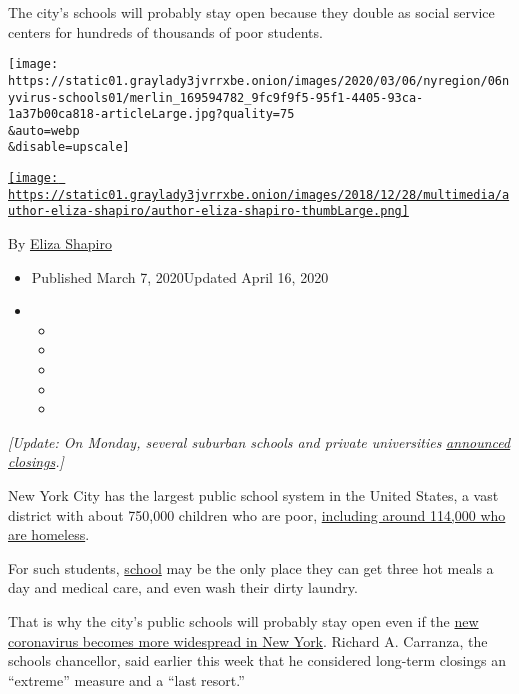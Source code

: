The city's schools will probably stay open because they double as social
service centers for hundreds of thousands of poor students.

\texttt{[image: https://static01.graylady3jvrrxbe.onion/images/2020/03/06/nyregion/06nyvirus-schools01/merlin\_169594782\_9fc9f9f5-95f1-4405-93ca-1a37b00ca818-articleLarge.jpg?quality=75\\\&auto=webp\\\&disable=upscale]}

\href{https://www.nytimes3xbfgragh.onion/by/eliza-shapiro}{\texttt{[image: https://static01.graylady3jvrrxbe.onion/images/2018/12/28/multimedia/author-eliza-shapiro/author-eliza-shapiro-thumbLarge.png]}}

By \href{https://www.nytimes3xbfgragh.onion/by/eliza-shapiro}{Eliza
Shapiro}

\begin{itemize}
\item
  Published March 7, 2020Updated April 16, 2020
\item
  \begin{itemize}
  \item
  \item
  \item
  \item
  \item
  \end{itemize}
\end{itemize}

\emph{{[}Update: On Monday, several suburban schools and private
universities}
\href{https://www.nytimes3xbfgragh.onion/2020/03/09/nyregion/coronavirus-new-york.html}{\emph{announced
closings}}\emph{.{]}}

New York City has the largest public school system in the United States,
a vast district with about 750,000 children who are poor,
\href{https://www.nytimes3xbfgragh.onion/interactive/2019/11/19/nyregion/student-homelessness-nyc.html}{including
around 114,000 who are homeless}.

For such students,
\href{https://www.nytimes3xbfgragh.onion/2020/04/16/nyregion/special-education-coronavirus-nyc.html}{school}
may be the only place they can get three hot meals a day and medical
care, and even wash their dirty laundry.

That is why the city's public schools will probably stay open even if
the
\href{https://www.nytimes3xbfgragh.onion/2020/03/07/nyregion/coronavirus-new-york-queens.html}{new
coronavirus becomes more widespread in New York}. Richard A. Carranza,
the schools chancellor, said earlier this week that he considered
long-term closings an ``extreme'' measure and a ``last resort.''

